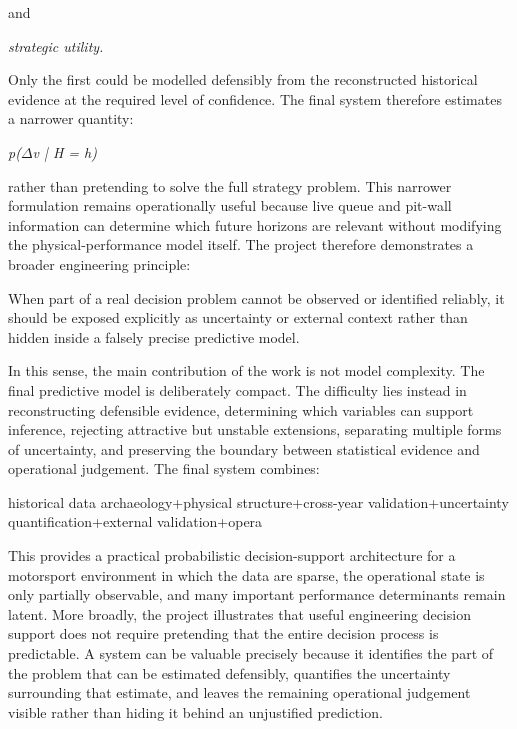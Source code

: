 and

\begin{center}\textit{strategic utility.}\end{center}

Only the first could be modelled defensibly from the reconstructed historical evidence at the required level of confidence. The final system therefore estimates a narrower quantity:

\begin{center}\textit{p(\ensuremath{\Delta}v | H = h)}\end{center}

rather than pretending to solve the full strategy problem. This narrower formulation remains operationally useful because live queue and pit-wall information can determine which future horizons are relevant without modifying the physical-performance model itself. The project therefore demonstrates a broader engineering principle:

When part of a real decision problem cannot be observed or identified reliably, it should be exposed explicitly as uncertainty or external context rather than hidden inside a falsely precise predictive model.

In this sense, the main contribution of the work is not model complexity. The final predictive model is deliberately compact. The difficulty lies instead in reconstructing defensible evidence, determining which variables can support inference, rejecting attractive but unstable extensions, separating multiple forms of uncertainty, and preserving the boundary between statistical evidence and operational judgement. The final system combines:

historical data archaeology+physical structure+cross-year validation+uncertainty quantification+external validation+opera

This provides a practical probabilistic decision-support architecture for a motorsport environment in which the data are sparse, the operational state is only partially observable, and many important performance determinants remain latent. More broadly, the project illustrates that useful engineering decision support does not require pretending that the entire decision process is predictable. A system can be valuable precisely because it identifies the part of the problem that can be estimated defensibly, quantifies the uncertainty surrounding that estimate, and leaves the remaining operational judgement visible rather than hiding it behind an unjustified prediction.

